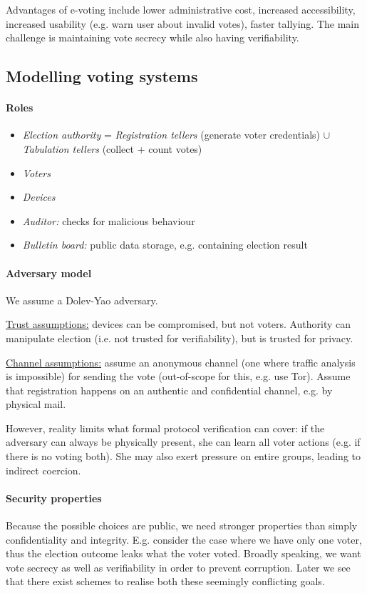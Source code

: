 Advantages of e-voting include lower administrative cost, increased accessibility, increased usability (e.g. warn user about invalid votes), faster tallying. The main challenge is maintaining vote secrecy while also having verifiability.


\subsection{Modelling voting systems}

\paragraph{Roles}
\begin{itemize}
    \item \emph{Election authority} = \emph{Registration tellers} (generate voter credentials) $\cup$ \emph{Tabulation tellers} (collect + count votes)
    \item \emph{Voters}
    \item \emph{Devices}
    \item \emph{Auditor:} checks for malicious behaviour
    \item \emph{Bulletin board:} public data storage, e.g. containing election result
\end{itemize}

\paragraph{Adversary model}
We assume a Dolev-Yao adversary.

\underline{Trust assumptions:} devices can be compromised, but not voters. Authority can manipulate election (i.e. not trusted for verifiability), but is trusted for privacy.

\underline{Channel assumptions:} assume an anonymous channel (one where traffic analysis is impossible) for sending the vote (out-of-scope for this, e.g. use Tor). Assume that registration happens on an authentic and confidential channel, e.g. by physical mail.

However, reality limits what formal protocol verification can cover:  if the adversary can always be physically present, she can learn all voter actions (e.g. if there is no voting both). She may also exert pressure on entire groups, leading to indirect coercion.

\paragraph{Security properties}
Because the possible choices are public, we need stronger properties than simply confidentiality and integrity. E.g. consider the case where we have only one voter, thus the election outcome leaks what the voter voted. Broadly speaking, we want vote secrecy as well as verifiability in order to prevent corruption. Later we see that there exist schemes to realise both these seemingly conflicting goals.

